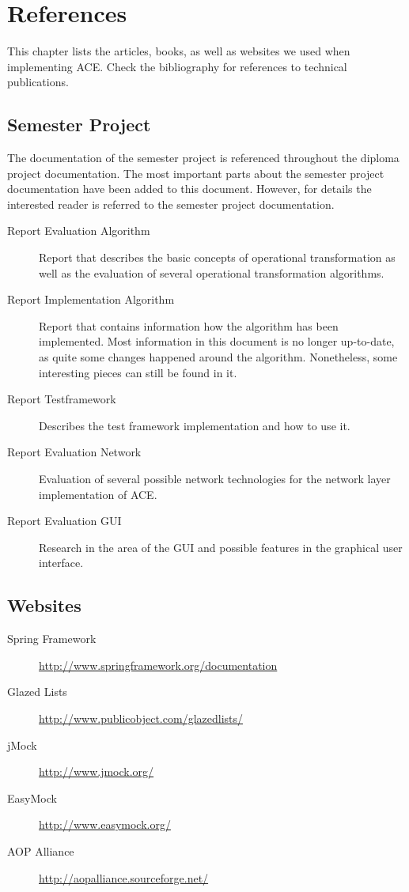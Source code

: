 \chapter{References}
\label{chapter:references}

This chapter lists the articles, books, as well as websites we used when
implementing ACE. Check the bibliography for references to technical
publications.


\section{Semester Project}
The documentation of the semester project is referenced throughout the
diploma project documentation. The most important parts about the 
semester project documentation have been added to this document. However,
for details the interested reader is referred to the semester project
documentation.

\begin{description}
 \item[Report Evaluation Algorithm] Report that describes the basic concepts of operational transformation as well as the evaluation of several operational transformation algorithms.
 \item[Report Implementation Algorithm] Report that contains information how the algorithm has been implemented. Most information in this document is no longer up-to-date, as quite some changes happened around the algorithm. Nonetheless, some interesting pieces can still be found in it.
 \item[Report Testframework] Describes the test framework implementation and how to use it.
 \item[Report Evaluation Network] Evaluation of several possible network technologies for the network layer implementation of ACE.
 \item[Report Evaluation GUI] Research in the area of the GUI and possible features in the graphical user interface.
\end{description}



\section{Websites}

\begin{description}
 \item[Spring Framework] \href{http://www.springframework.org/documentation}{http://www.springframework.org/documentation}
 \item[Glazed Lists] \href{http://www.publicobject.com/glazedlists/}{http://www.publicobject.com/glazedlists/}
 \item[jMock] \href{http://www.jmock.org/}{http://www.jmock.org/}
 \item[EasyMock] \href{http://www.easymock.org/}{http://www.easymock.org/}
 \item[AOP Alliance] \href{http://aopalliance.sourceforge.net/}{http://aopalliance.sourceforge.net/}
\end{description}




